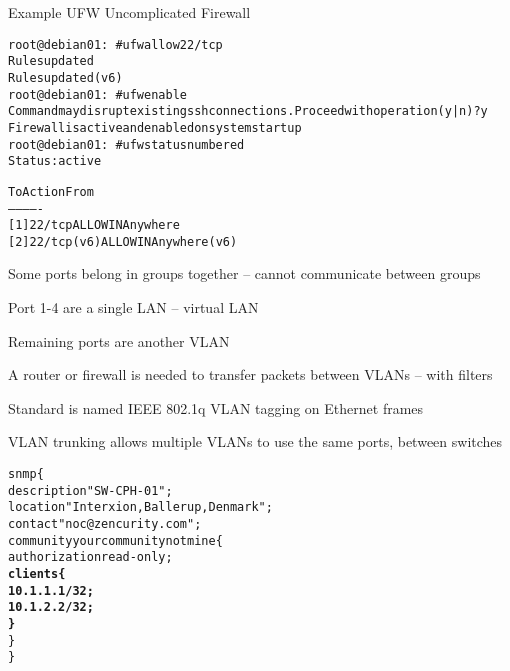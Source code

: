 \documentclass[Screen16to9,17pt]{foils}
\begin{document}

Example UFW Uncomplicated Firewall
\begin{alltt}\footnotesize
root@debian01:~# ufw allow 22/tcp
Rules updated
Rules updated (v6)
root@debian01:~# ufw enable
Command may disrupt existing ssh connections. Proceed with operation (y|n)? y
Firewall is active and enabled on system startup
root@debian01:~# ufw status numbered
Status: active

     To                         Action      From
     --                         ------      ----
[ 1] 22/tcp                     ALLOW IN    Anywhere
[ 2] 22/tcp (v6)                ALLOW IN    Anywhere (v6)
\end{alltt}






\begin{list1}
\item Some ports belong in groups together -- cannot communicate between groups
\item Port 1-4 are a single LAN -- virtual LAN
\item Remaining ports are another VLAN
\item A router or firewall is needed to transfer packets between VLANs -- with filters
\end{list1}



\begin{list1}
\item Standard is named IEEE 802.1q VLAN tagging  on Ethernet frames
\item VLAN trunking allows multiple VLANs to use the same ports, between switches
\end{list1}



\begin{alltt}
snmp \{
    description "SW-CPH-01";
    location "Interxion, Ballerup, Denmark";
    contact "noc@zencurity.com";
    community yourcommunitynotmine \{
        authorization read-only;
        {\bf clients \{
               10.1.1.1/32;
               10.1.2.2/32;
        \}    }
    \}
\}
\end{alltt}
\end{document}
